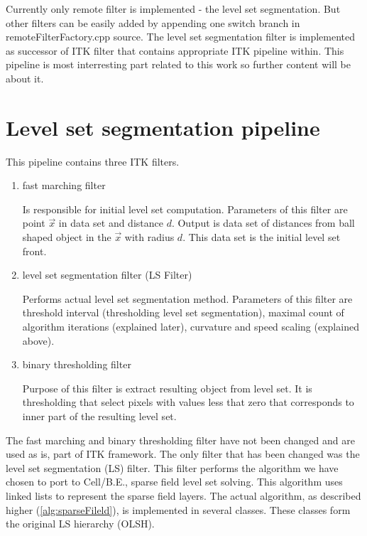 Currently only remote filter is implemented - the level set segmentation.
But other filters can be easily added by appending one switch branch in remoteFilterFactory.cpp source.
The level set segmentation filter is implemented as successor of ITK filter that contains appropriate ITK pipeline within.
This pipeline is most interresting part related to this work so further content will be about it.

\section{Level set segmentation pipeline}

This pipeline contains three ITK filters.
\begin{enumerate}
  \item{fast marching filter}
  \par
  Is responsible for initial level set computation.
Parameters of this filter are point $\vec{x}$ in data set and distance $d$.
Output is data set of distances from ball shaped object in the $\vec{x}$ with radius $d$.
This data set is the initial level set front.

  \item{level set segmentation filter (LS Filter)}
  \par
  Performs actual level set segmentation method.
Parameters of this filter are threshold interval (thresholding level set segmentation),  maximal count of algorithm iterations (explained later), curvature and speed scaling (explained above).

  \item{binary thresholding filter}
  \par
  Purpose of this filter is extract resulting object from level set.
It is thresholding that select pixels with values less that zero that corresponds to inner part of the resulting level set.
\end{enumerate}

The fast marching and binary thresholding filter have not been changed and are used as is, part of ITK framework.
The only filter that has been changed was the level set segmentation (LS) filter.
This filter performs the algorithm we have chosen to port to Cell/B.E., sparse field level set solving.
This algorithm uses linked lists to represent the sparse field layers.
The actual algorithm, as described higher (\ref{alg:sparseFileld}), is implemented in several classes.
These classes form the original LS hierarchy (OLSH).

